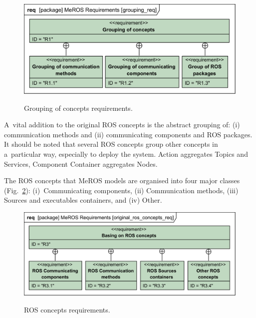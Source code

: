\documentclass[11pt,oneside,a4paper]{report}
\begin{document}
	\begin{figure}[H]
		\centering
		\begin{center}
			{\includegraphics[scale=1.0]{diagrams/grouping_req.png}}
		\end{center}
		\caption{Grouping of concepts requirements.} 
		\label{fig:grouping_req}
	\end{figure}
	
	A~vital addition to the original ROS concepts is the abstract grouping of:  (i) communication methods and (ii) communicating components and ROS packages.  It should be noted that several ROS concepts group other concepts in a~particular way, especially to deploy the system. Action aggregates Topics and Services, Component Container aggregates Nodes.

		
	The ROS concepts that MeROS models are organised into four major classes (Fig.~\ref{fig:ros_concepts_req}): (i)~Communicating components, (ii) Communication methods, (iii) Sources and executables containers, and (iv) Other.
	

	\begin{figure}[H]
		\centering
		\begin{center}
			{\includegraphics[scale=1.0]{diagrams/original_ros_concepts_req.png}}
		\end{center}
		\caption{ROS concepts requirements.} 
		\label{fig:ros_concepts_req}
	\end{figure}

	\pagebreak
	
\end{document}
